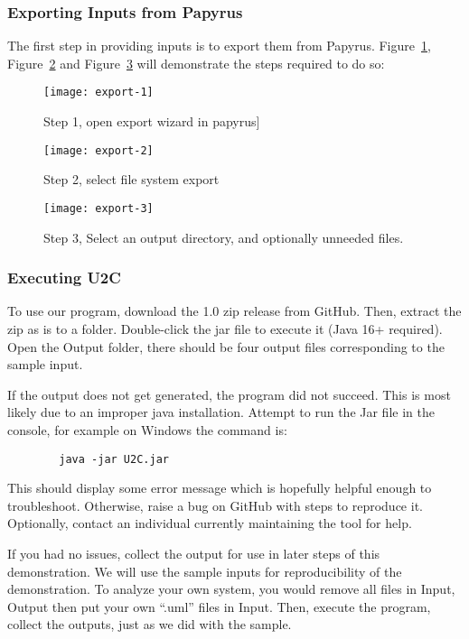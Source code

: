     \subsubsection{Exporting Inputs from Papyrus}
    The first step in providing inputs is to export them from Papyrus.
    Figure~\ref{fig:export-1}, Figure~\ref{fig:export-2} and Figure~\ref{fig:export-3} will demonstrate the steps required to do so:
    \begin{figure}[h]
        \centering
        \texttt{[image: export-1]}
        \caption{Step 1, open export wizard in papyrus]}
        \label{fig:export-1}
    \end{figure}
    \begin{figure}[h]
        \centering
        \texttt{[image: export-2]}
        \caption{Step 2, select file system export}
        \label{fig:export-2}
    \end{figure}
    \begin{figure}[h]
        \centering
        \texttt{[image: export-3]}
        \caption{Step 3, Select an output directory, and optionally unneeded files.}
        \label{fig:export-3}
    \end{figure}

    \newpage
    \subsubsection{Executing U2C}\label{subsubsec:exec}
    To use our program, download the 1.0 zip release from GitHub.
    Then, extract the zip as is to a folder.
    Double-click the jar file to execute it (Java 16+ required).
    Open the Output folder, there should be four output files corresponding to the sample input.

    If the output does not get generated, the program did not succeed.
    This is most likely due to an improper java installation.
    Attempt to run the Jar file in the console, for example on Windows the command is:
    \begin{verbatim}
        java -jar U2C.jar
    \end{verbatim}
    This should display some error message which is hopefully helpful enough to troubleshoot.
    Otherwise, raise a bug on GitHub with steps to reproduce it.
    Optionally, contact an individual currently maintaining the tool for help.

    If you had no issues, collect the output for use in later steps of this demonstration.
    We will use the sample inputs for reproducibility of the demonstration.
    To analyze your own system, you would remove all files in Input, Output then put your own ``.uml'' files in Input.
    Then, execute the program, collect the outputs, just as we did with the sample.

